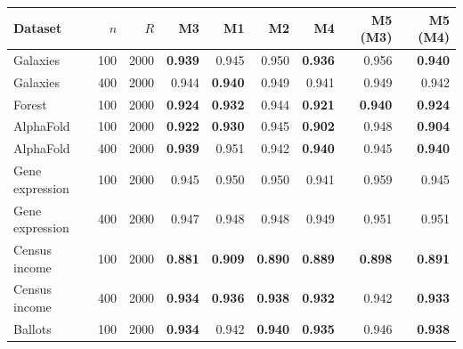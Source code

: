 \begin{tabular}{lrrrrrrrr}
\toprule
Dataset & $n$ & $R$ & M3 & M1 & M2 & M4 & M5 (M3) & M5 (M4) \\
\midrule
Galaxies & 100 & 2000 & \textbf{0.939} & 0.945 & 0.950 & \textbf{0.936} & 0.956 & \textbf{0.940} \\
Galaxies & 400 & 2000 & 0.944 & \textbf{0.940} & 0.949 & 0.941 & 0.949 & 0.942 \\
Forest & 100 & 2000 & \textbf{0.924} & \textbf{0.932} & 0.944 & \textbf{0.921} & \textbf{0.940} & \textbf{0.924} \\
AlphaFold & 100 & 2000 & \textbf{0.922} & \textbf{0.930} & 0.945 & \textbf{0.902} & 0.948 & \textbf{0.904} \\
AlphaFold & 400 & 2000 & \textbf{0.939} & 0.951 & 0.942 & \textbf{0.940} & 0.945 & \textbf{0.940} \\
Gene expression & 100 & 2000 & 0.945 & 0.950 & 0.950 & 0.941 & 0.959 & 0.945 \\
Gene expression & 400 & 2000 & 0.947 & 0.948 & 0.948 & 0.949 & 0.951 & 0.951 \\
Census income & 100 & 2000 & \textbf{0.881} & \textbf{0.909} & \textbf{0.890} & \textbf{0.889} & \textbf{0.898} & \textbf{0.891} \\
Census income & 400 & 2000 & \textbf{0.934} & \textbf{0.936} & \textbf{0.938} & \textbf{0.932} & 0.942 & \textbf{0.933} \\
Ballots & 100 & 2000 & \textbf{0.934} & 0.942 & \textbf{0.940} & \textbf{0.935} & 0.946 & \textbf{0.938} \\
\bottomrule
\end{tabular}
